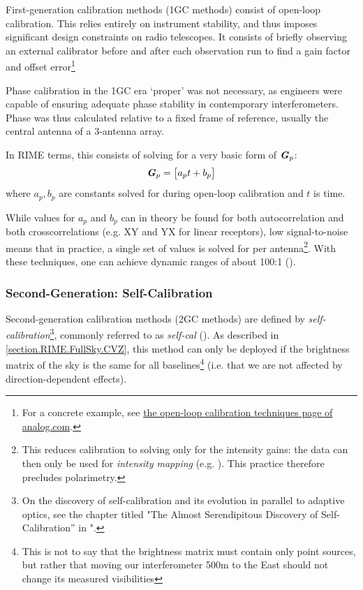 \pg
First-generation calibration methods (1GC methods) consist of open-loop calibration. This relies entirely on instrument stability, and thus imposes significant design constraints on radio telescopes. It consists of briefly observing an external calibrator before and after each observation run to find a gain factor and offset error\footnote{For a concrete example, see \href{http://www.analog.com/en/analog-dialogue/articles/open-loop-calibration-techniques.html}{the open-loop calibration techniques page of analog.com}.}

\pg
Phase calibration in the 1GC era `proper' was not necessary, as engineers were capable of ensuring adequate phase stability in contemporary interferometers. Phase was thus calculated relative to a fixed frame of reference, usually the central antenna of a 3-antenna array. 

\pg
In RIME terms, this consists of solving for a very basic form of $\textbf{\emph{G}}_p$:
\begin{equation}
\Gjones_p = \begin{bmatrix} a_p t + b_p \end{bmatrix} %
\end{equation}
where $a_p,b_p$ are constants solved for during open-loop calibration and $t$ is time. %

\pg
While values for $a_p$ and $b_p$ can in theory be found for both autocorrelation and both crosscorrelations (e.g. XY and YX for linear receptors), low signal-to-noise means that in practice, a single set of values is solved for per antenna\footnote{This reduces calibration to solving only for the intensity gains: the data can then only be used for \emph{intensity mapping} (e.g. ). This practice therefore precludes polarimetry.}. With these techniques, one can achieve dynamic ranges of about 100:1 ().

\subsubsection{Second-Generation: Self-Calibration}\label{section.calibration.2gc}

\pg
Second-generation calibration methods (2GC methods) are defined by \emph{self-calibration}\footnote{On the discovery of self-calibration and its evolution in parallel to adaptive optics, see the chapter titled "The Almost Serendipitous Discovery of Self-Calibration'' in "\href{http://library.nrao.edu/public/collection/02000000000280.pdf}{\citep{serendipitous}}.}, commonly referred to as \emph{self-cal} (). As described in \cref{section.RIME.FullSky.CVZ}, this method can only be deployed if the brightness matrix of the sky is the same for all baselines\footnote{This is not to say that the brightness matrix must contain only point sources, but rather that moving our interferometer 500m to the East should not change its measured visibilities} (i.e. that we are not affected by direction-dependent effects).

